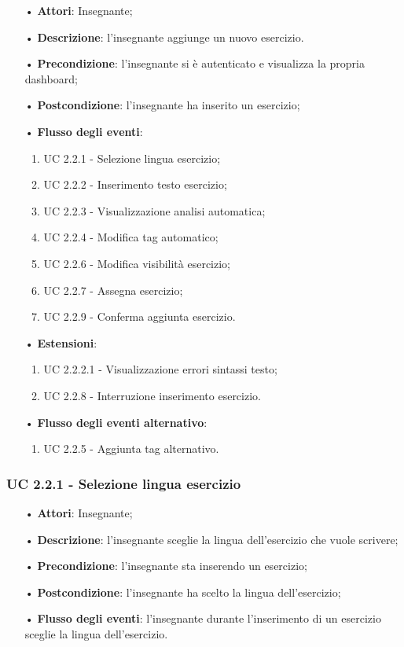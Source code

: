 \begin{itemize}
	\item[•] \textbf{Attori}: Insegnante;
	\item[•] \textbf{Descrizione}: l'insegnante aggiunge un nuovo esercizio. 
	\item[•] \textbf{Precondizione}: l'insegnante si è autenticato e visualizza la propria dashboard;
	\item[•] \textbf{Postcondizione}: l'insegnante ha inserito un esercizio;
	\item[•] \textbf{Flusso degli eventi}:
	\begin{enumerate}
		\item UC 2.2.1 - Selezione lingua esercizio;
		\item UC 2.2.2 - Inserimento testo esercizio;
		\item UC 2.2.3 - Visualizzazione analisi automatica;
		\item UC 2.2.4 - Modifica tag automatico;
		\item UC 2.2.6 - Modifica visibilità esercizio;
		\item UC 2.2.7 - Assegna esercizio;
		\item UC 2.2.9 - Conferma aggiunta esercizio.
	\end{enumerate}
	\item[•] \textbf{Estensioni}:	
	\begin{enumerate}
		\item UC 2.2.2.1 - Visualizzazione errori sintassi testo;
		\item UC 2.2.8 - Interruzione inserimento esercizio.
	\end{enumerate}
	\item[•] \textbf{Flusso degli eventi alternativo}:
	\begin{enumerate}
		\item UC 2.2.5 - Aggiunta tag alternativo.
	\end{enumerate}
\end{itemize}
 

\subsubsection{UC 2.2.1 - Selezione lingua esercizio}
\begin{itemize}
	\item[•] \textbf{Attori}: Insegnante;
	\item[•] \textbf{Descrizione}: l'insegnante sceglie la lingua dell'esercizio che vuole scrivere;
	\item[•] \textbf{Precondizione}: l'insegnante sta inserendo un esercizio;
	\item[•] \textbf{Postcondizione}: l'insegnante ha scelto la lingua dell'esercizio;
	\item[•] \textbf{Flusso degli eventi}: l'insegnante durante l'inserimento di un esercizio sceglie la lingua dell'esercizio.
\end{itemize}

